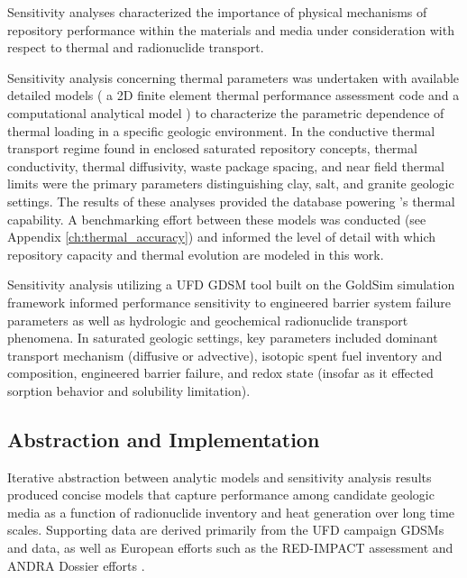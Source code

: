 Sensitivity analyses characterized the importance of physical mechanisms of 
repository performance  within the materials and media under consideration with 
respect to thermal and radionuclide transport.

Sensitivity analysis concerning thermal parameters was undertaken with available 
detailed models ( a 2D finite element thermal performance assessment code 
\cite{huff_benchmarking_2012, huff_numerical_2012} and a computational 
analytical model \cite{greenberg_application_2012}) to characterize the 
parametric dependence of thermal loading in a specific geologic environment.  In 
the conductive thermal transport regime found in enclosed saturated repository 
concepts, thermal conductivity, thermal diffusivity, waste package spacing, and 
near field thermal limits were the primary parameters distinguishing clay, salt, 
and granite geologic settings. The results of these analyses provided the 
database powering \Cyder's thermal capability. A benchmarking effort between 
these models was conducted (see Appendix \ref{ch:thermal_accuracy}) and informed 
the level of detail with which repository capacity and thermal evolution are 
modeled in this work.  

Sensitivity analysis utilizing a \gls{UFD} \gls{GDSM} tool built on the 
GoldSim simulation framework informed performance sensitivity to engineered 
barrier system failure parameters as well as hydrologic and geochemical 
radionuclide transport phenomena. In saturated geologic settings, key parameters 
included dominant transport mechanism (diffusive or 
advective), isotopic spent fuel inventory and composition, engineered barrier 
failure, and redox state (insofar as it effected sorption behavior and 
solubility limitation).

\subsection{Abstraction and Implementation}


Iterative abstraction between analytic models and sensitivity analysis results 
produced concise models that capture performance among candidate geologic media 
as a function of radionuclide inventory and heat generation over long time 
scales. Supporting data are derived primarily from the \gls{UFD} campaign 
\glspl{GDSM} and data, as well as European efforts such as the RED-IMPACT 
assessment and \gls{ANDRA} Dossier efforts \cite{von_lensa_red-impact_2008, 
andra_argile:_2005, clayton_generic_2011} . 

